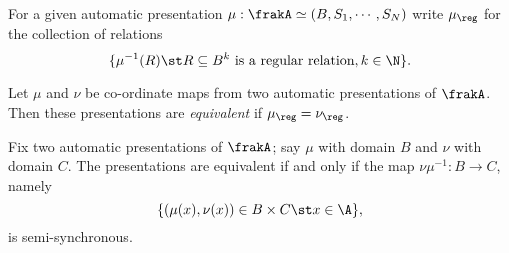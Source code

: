 
For a given automatic presentation $\mu:\frakA \simeq (B,S_1,\cdots,S_N)$ 
write $\mu_{\reg}$ for the collection of relations
$$
\{\mu^{-1}(R) \st R \subseteq B^k \text{ is a regular relation}, k \in \N\}.
$$

\begin{definition}
Let $\mu$ and $\nu$ be co-ordinate maps from two automatic presentations of $\frakA$.
Then these presentations are {\em equivalent} if $\mu_{\reg}  = \nu_{\reg}$.
\end{definition}

\begin{theorem}
Fix two automatic presentations of $\frakA$; say $\mu$ with domain $B$ and $\nu$ with domain $C$.
The presentations are equivalent if and only if the map $\nu \mu^{-1}:B \to C$, namely
 \[
  \{(\mu(x), \nu(x)) \in B \times C\st x \in \A\},
 \]
is semi-synchronous.
\end{theorem}

